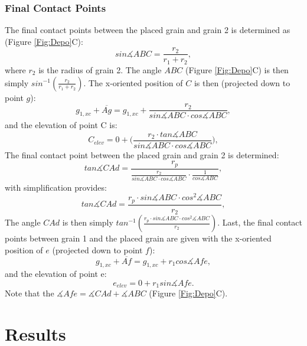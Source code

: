 \documentclass[12pt]{article}
\begin{document}
\subsubsection{Final Contact Points}
The final contact points between the placed grain and grain 2 is determined as (Figure \ref{Fig:Depo}C):
\begin{equation}
sin \measuredangle ABC = \frac{r_2}{r_1+r_2},
\label{Eqn 6}
\end{equation}
where $r_2$ is the radius of grain 2. The angle $ABC$  (Figure \ref{Fig:Depo}C) is then simply $sin^{-1}(\frac{r_2}{r_1+r_2})$. The x-oriented position of $C$ is then (projected down to point $g$):
\begin{equation}
g_{1,xc} + \overline{Ag} = g_{1,xc} + \frac{r_2}{sin \measuredangle ABC\cdot cos \measuredangle ABC},
\label{Eqn 7}
\end{equation}
and the elevation of point C is:
\begin{equation}
C_{elev} = 0 + \biggl(\frac{r_2\cdot tan \measuredangle ABC}{sin \measuredangle ABC\cdot cos \measuredangle ABC}\biggr),
\label{Eqn 8}
\end{equation}
The final contact point between the placed grain and grain 2 is determined:
\begin{equation}
tan \measuredangle CAd = \frac{r_p}{\frac{r_2}{sin \measuredangle ABC\cdot cos \measuredangle ABC}\cdot \frac{1}{cos \measuredangle ABC}},
\label{Eqn 9}
\end{equation}
with simplification provides:
\begin{equation}
tan \measuredangle CAd = \frac{r_p \cdot sin \measuredangle ABC\cdot cos^2 \measuredangle ABC}{r_2},
\label{Eqn 10}
\end{equation}
The angle $CAd$ is then simply $tan^{-1}(\frac{r_p \cdot sin \measuredangle ABC\cdot cos^2 \measuredangle ABC}{r_2})$. Last, the final contact points between grain 1 and the placed grain are given with the x-oriented position of $e$ (projected down to point $f$):
\begin{equation}
g_{1,xc}+\overline{Af} = g_{1,xc}+r_1cos \measuredangle Afe,
\label{Eqn 11}
\end{equation}
and the elevation of point e:
\begin{equation}
e_{elev}=0 + r_1sin \measuredangle Afe.
\label{Eqn 12}
\end{equation}
Note that the $\measuredangle Afe = \measuredangle CAd + \measuredangle ABC$ (Figure \ref{Fig:Depo}C).
\pagebreak
\section{Results}
\end{document}
